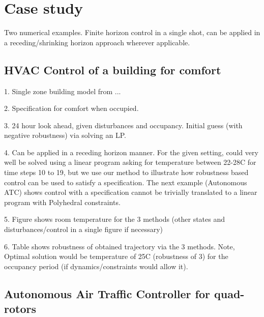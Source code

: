 \section{Case study}
\label{sec:case study}
Two numerical examples. Finite horizon control in a single shot, can be applied in a receding/shrinking horizon approach wherever applicable. 


\subsection{HVAC Control of a building for comfort}
1. Single zone building model from ...

2. Specification for comfort when occupied.

3. 24 hour look ahead, given disturbances and occupancy. Initial guess (with negative robustness) via solving an LP.

4. Can be applied in a receding horizon manner. For the given setting, could very well be solved using a linear program asking for temperature between 22-28C for time steps 10 to 19, but we use our method to illustrate how robustness based control can be used to satisfy a specification. The next example (Autonomous ATC) shows control with a specification cannot be trivially translated to a linear program with Polyhedral constraints.

5. Figure shows room temperature for the 3 methods (other states and disturbances/control in a single figure if necessary)

6. Table shows robustness of obtained trajectory via the 3 methods. Note, Optimal solution would be temperature of 25C  (robustness of 3) for the occupancy period (if dynamics/constraints would allow it).



\subsection{Autonomous Air Traffic Controller for quad-rotors}

